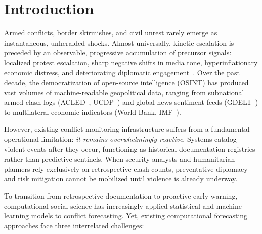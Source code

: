 \documentclass[preprint,12pt]{elsarticle}
\begin{document}
\section{Introduction}
\label{sec:intro}

Armed conflicts, border skirmishes, and civil unrest rarely emerge as instantaneous, unheralded shocks. Almost universally, kinetic escalation is preceded by an observable, progressive accumulation of precursor signals: localized protest escalation, sharp negative shifts in media tone, hyperinflationary economic distress, and deteriorating diplomatic engagement~\cite{hegre2019views, hegre2018forecasting, hegre2019predicting, ward2013predicting, brandt2016forecasting}. Over the past decade, the democratization of open-source intelligence (OSINT) has produced vast volumes of machine-readable geopolitical data, ranging from subnational armed clash logs (ACLED~\cite{raleigh2010introducing}, UCDP~\cite{sundberg2013introducing}) and global news sentiment feeds (GDELT~\cite{leetaru2013gdelt}) to multilateral economic indicators (World Bank, IMF~\cite{mach2019climate, hsiang2013quantifying, burke2015global, miguel2004economic, collier2004greed, fearon2003ethnicity}).

However, existing conflict-monitoring infrastructure suffers from a fundamental operational limitation: \emph{it remains overwhelmingly reactive}. Systems catalog violent events after they occur, functioning as historical documentation registries rather than predictive sentinels. When security analysts and humanitarian planners rely exclusively on retrospective clash counts, preventative diplomacy and risk mitigation cannot be mobilized until violence is already underway.

To transition from retrospective documentation to proactive early warning, computational social science has increasingly applied statistical and machine learning models to conflict forecasting. Yet, existing computational forecasting approaches face three interrelated challenges:
\end{document}

